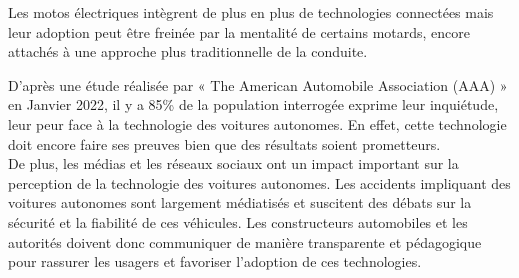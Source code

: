 Les motos électriques intègrent de plus en plus de technologies connectées mais leur adoption peut être freinée par la mentalité de certains motards, encore attachés à une approche plus traditionnelle de la conduite.
\vspace{0.5cm}

D'après une étude réalisée par « The American Automobile Association (AAA) »\cite{consumer_skepticim} en Janvier 2022, il y a 85\% de la population interrogée exprime leur inquiétude, leur peur face à la technologie des voitures autonomes. En effet, cette technologie doit encore faire ses preuves bien que des résultats soient prometteurs.\\
De plus, les médias et les réseaux sociaux ont un impact important sur la perception de la technologie des voitures autonomes. Les accidents impliquant des voitures autonomes sont largement médiatisés et suscitent des débats sur la sécurité et la fiabilité de ces véhicules. Les constructeurs automobiles et les autorités doivent donc communiquer de manière transparente et pédagogique pour rassurer les usagers et favoriser l’adoption de ces technologies.\\
\vspace{0.5cm}

